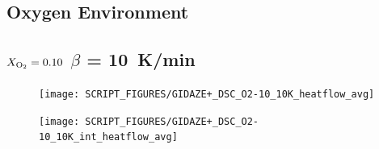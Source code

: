 \documentclass{book}
\begin{document}
\begin{landscape}
\newpage
\section{Oxygen Environment}
\label{DSC_O2}
\subsection{$X_{\rm O_2}=0.10$ $\beta$ = 10~K/min}
\begin{minipage}{0.65\textwidth}
\begin{figure}[H]
{\texttt{[image: SCRIPT\_FIGURES/GIDAZE+\_DSC\_O2-10\_10K\_heatflow\_avg]}}\\
\end{figure}
\end{minipage} 
\begin{minipage}{0.35\textwidth}
\begin{figure}[H]
{\texttt{[image: SCRIPT\_FIGURES/GIDAZE+\_DSC\_O2-10\_10K\_int\_heatflow\_avg]}}\\
\end{figure}
\end{minipage}\\
\vfill


\end{landscape}
\end{document}
